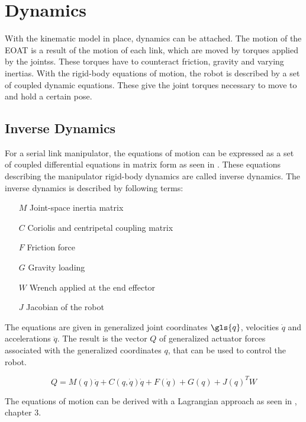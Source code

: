 \section{Dynamics}

With the kinematic model in place, dynamics can be attached. The motion of the \ac{EOAT} is a result of the motion of each link, which are moved by torques applied by the \glspl{joints}. These torques have to counteract friction, gravity and varying inertias.
With the rigid-body equations of motion, the robot is described by a set of coupled dynamic equations. These give the joint torques necessary to move to and hold a certain pose.

\subsection{Inverse Dynamics}

For a serial link manipulator, the equations of motion can be expressed as a set of coupled differential equations in matrix form as seen in . These equations describing the manipulator rigid-body dynamics are called inverse dynamics.
The inverse dynamics is described by following terms:
\begin{itemize}
	\item[$ M $] Joint-space inertia matrix
	\item[$ C $] Coriolis and centripetal coupling matrix
	\item[$ F $] Friction force
	\item[$ G $] Gravity loading
	\item[$ W $] Wrench applied at the end effector
	\item[$ J $] Jacobian of the robot
\end{itemize}
The equations are given in generalized joint coordinates $\gls{q}$, velocities $\dot{q}$ and accelerations $\ddot{q}$.
The result is the vector $Q$ of generalized actuator forces associated with the generalized coordinates $ q$, that can be used to control the robot.

\begin{equation}\label{eq:RBeqMot}
	Q=M(q)\ddot{q}+C(q,\dot{q})\dot{q}+F(\dot{q})+G(q)+J(q)^TW
\end{equation}

The equations of motion can be derived with a Lagrangian approach as seen in \cite{MathIntroRobManip}, chapter 3.

